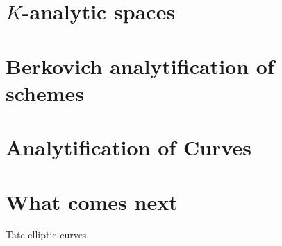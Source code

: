\documentclass[a4paper]{article}
\begin{document}
\section{$K$-analytic spaces} \label{sec:K_analytic_spaces}




\section{Berkovich analytification of schemes} \label{sec:berkovich_analytification_of_schemes}



\section{Analytification of Curves} \label{sec:analytification_of_curves}


\section{What comes next} \label{sec:what_comes_next}

Tate elliptic curves

\printbibliography
\end{document}
